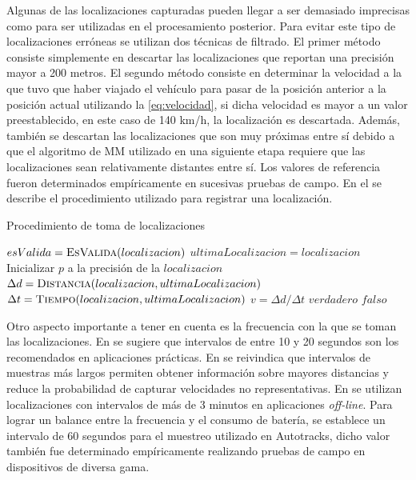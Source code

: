 Algunas de las localizaciones capturadas pueden llegar a ser demasiado imprecisas como para ser utilizadas en el procesamiento posterior. Para evitar este tipo de localizaciones erróneas se utilizan dos técnicas de filtrado. El primer método consiste simplemente en descartar las localizaciones que reportan una precisión mayor a 200 metros. El segundo método consiste en determinar la velocidad a la que tuvo que haber viajado el vehículo para pasar de la posición anterior a la posición actual utilizando la \cref{eq:velocidad}, si dicha velocidad es mayor a un valor preestablecido, en este caso de 140 km/h, la localización es descartada. Además, también se descartan las localizaciones que son muy próximas entre sí debido a que el algoritmo de MM utilizado en una siguiente etapa requiere que las localizaciones sean relativamente distantes entre sí. Los valores de referencia fueron determinados empíricamente en sucesivas pruebas de campo. En el  se describe el procedimiento utilizado para registrar una localización.

\begin{algorithm}
	\caption{Procedimiento de toma de localizaciones}
	\label{alg:toma_de_localizaciones}
	\begin{algorithmic}[1]
		\State $esValida = \Call{EsValida}{localizacion}$
		\State $ultimaLocalizacion = localizacion$
		\EndIf
		\EndProcedure
		\Statex
		\State Inicializar $p$ a la precisión de la $localizacion$	
		\State $\Delta d = \Call{Distancia}{localizacion, ultimaLocalizacion}$
		\State $\Delta t = \Call{Tiempo}{localizacion, ultimaLocalizacion}$
		\State $v = \Delta d / \Delta t$
		\State \Return $verdadero$
		\Else
		\State \Return $falso$
		\EndIf
		\EndFunction
	\end{algorithmic}
\end{algorithm}

Otro aspecto importante a tener en cuenta es la frecuencia con la que se toman las localizaciones. En \citep{tao2012real} se sugiere que intervalos de entre 10 y 20 segundos son los recomendados en aplicaciones prácticas. En \citep{fontaine2005part} se reivindica que intervalos de muestras más largos permiten obtener información sobre mayores distancias y reduce la probabilidad de capturar velocidades no representativas. En \citep{lou2009map,giovannini2011novel} se utilizan localizaciones con intervalos de más de 3 minutos en aplicaciones \emph{off-line}. Para lograr un balance entre la frecuencia y el consumo de batería, se establece un intervalo de 60 segundos para el muestreo utilizado en Autotracks, dicho valor también fue determinado empíricamente realizando pruebas de campo en dispositivos de diversa gama.

